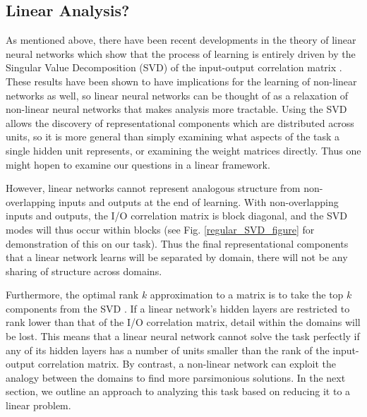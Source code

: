 \documentclass[10pt,letterpaper]{article}
\begin{document}
\subsection{Linear Analysis?}
As mentioned above, there have been recent developments in the theory of linear neural networks which show that the process of learning is entirely driven by the Singular Value Decomposition (SVD) of the input-output correlation matrix \citep{Saxe2013}. These results have been shown to have implications for the learning of non-linear networks as well, so linear neural networks can be thought of as a relaxation of non-linear neural networks that makes analysis more tractable. Using the SVD allows the discovery of representational components which are distributed across units, so it is more general than simply examining what aspects of the task a single hidden unit represents, or examining the weight matrices directly. Thus one might hopen to examine our questions in a linear framework. \par
However, linear networks cannot represent analogous structure from non-overlapping inputs and outputs at the end of learning. With non-overlapping inputs and outputs, the I/O correlation matrix is block diagonal, and the SVD modes will thus occur within blocks (see Fig. \ref{regular_SVD_figure} for demonstration of this on our task). Thus the final representational components that a linear network learns will be separated by domain, there will not be any sharing of structure across domains.\par 
Furthermore, the optimal rank $k$ approximation to a matrix is to take the top $k$ components from the SVD \citep{Mirsky1960}. If a linear network's hidden layers are restricted to rank lower than that of the I/O correlation matrix, detail within the domains will be lost. This means that a linear neural network cannot solve the task perfectly if any of its hidden layers has a number of units smaller than the rank of the input-output correlation matrix. By contrast, a non-linear network can exploit the analogy between the domains to find more parsimonious solutions. In the next section, we outline an approach to analyzing this task based on reducing it to a linear problem.
\end{document}
